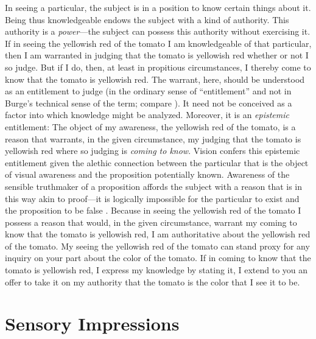 \documentclass[12pt]{article}
\begin{document}
In seeing a particular, the subject is in a position to know certain things about it. Being thus knowledgeable endows the subject with a kind of authority. This authority is a \emph{power}---the subject can possess this authority without exercising it. If in seeing the yellowish red of the tomato I am knowledgeable of that particular, then I am warranted in judging that the tomato is yellowish red whether or not I so judge. But if I do, then, at least in propitious circumstances, I thereby come to know that the tomato is yellowish red. The warrant, here, should be understood as an entitlement to judge (in the ordinary sense of ``entitlement'' and not in Burge's \citeyear{Burge:2003fk} technical sense of the term; compare \citealt[132n]{McDowell:2009ys}). It need not be conceived as a factor into which knowledge might be analyzed. Moreover, it is an \emph{epistemic} entitlement: The object of my awareness, the yellowish red of the tomato, is a reason that warrants, in the given circumstance, my judging that the tomato is yellowish red where so judging is \emph{coming to know}. Vision confers this epistemic entitlement given the alethic connection between the particular that is the object of visual awareness and the proposition potentially known. Awareness of the sensible truthmaker of a proposition affords the subject with a reason that is in this way akin to proof---it is logically impossible for the particular to exist and the proposition to be false \citep[see][]{Cook-Wilson:1926sf,Kalderon:2010fk}. Because in seeing the yellowish red of the tomato I possess a reason that would, in the given circumstance, warrant my coming to know that the tomato is yellowish red, I am authoritative about the yellowish red of the tomato. My seeing the yellowish red of the tomato can stand proxy for any inquiry on your part about the color of the tomato. If in coming to know that the tomato is yellowish red, I express my knowledge by stating it, I extend to you an offer to take it on my authority that the tomato is the color that I see it to be. 


\section{Sensory Impressions} %
\label{sec:sensory_impressions}
\end{document}
